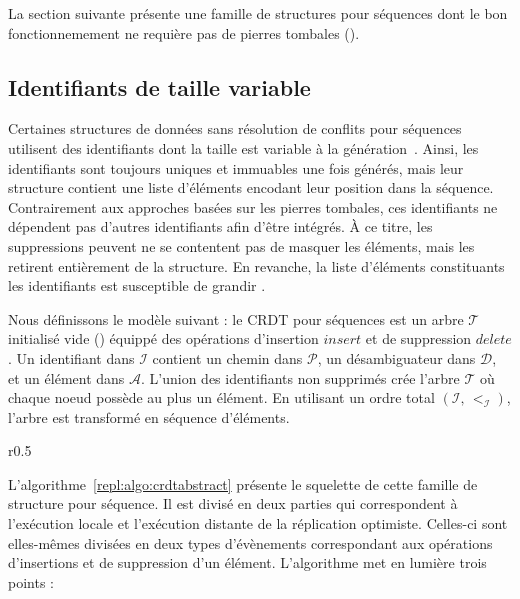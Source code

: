 La section suivante présente une famille de structures pour séquences dont le
bon fonctionnemement ne requière pas de pierres tombales ().

\subsection{Identifiants de taille variable}

Certaines structures de données sans résolution de conflits pour séquences
utilisent des identifiants dont la taille est variable à la
génération~\cite{andre2013supporting, preguica2009commutative,
  weiss2009logoot}. Ainsi, les identifiants sont toujours uniques et immuables
une fois générés, mais leur structure contient une liste d'éléments encodant
leur position dans la séquence.  Contrairement aux approches basées sur les
pierres tombales, ces identifiants ne dépendent pas d'autres identifiants afin
d'être intégrés. À ce titre, les suppressions peuvent ne se contentent pas de
masquer les éléments, mais les retirent entièrement de la structure. En
revanche, la liste d'éléments constituants les identifiants est susceptible de
grandir . 

Nous définissons le modèle suivant : le CRDT pour séquences est un arbre
$\mathcal{T}$ initialisé vide () équippé des opérations d'insertion
$insert$ et de suppression $delete$. Un identifiant dans $\mathcal{I}$ contient
un chemin dans $\mathcal{P}$, un désambiguateur dans $\mathcal{D}$, et un
élément dans $\mathcal{A}$. L'union des identifiants non supprimés crée l'arbre
$\mathcal{T}$ où chaque noeud possède au plus un élément.  En utilisant un ordre
total $(\mathcal{I},\, <_\mathcal{I})$, l'arbre est transformé en séquence
d'éléments. 

\begin{wrapfigure}{r}{0.5\textwidth}
  \vspace{-35pt} %
  \begin{minipage}[t]{0.5\textwidth}
    \begin{algorithm}[H]
      
      \caption{\label{repl:algo:crdtabstract} Squelette.}
    \end{algorithm}
  \end{minipage}
  \vspace{-35pt}
\end{wrapfigure}

L'algorithme~\ref{repl:algo:crdtabstract} présente le squelette de cette famille
de structure pour séquence.  Il est divisé en deux parties qui correspondent à
l'exécution locale et l'exécution distante de la réplication
optimiste. Celles-ci sont elles-mêmes divisées en deux types d'évènements
correspondant aux opérations d'insertions et de suppression d'un
élément. L'algorithme met en lumière trois points :

